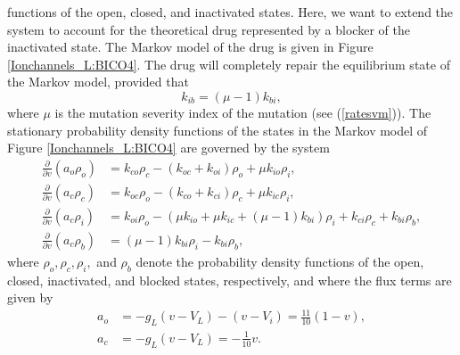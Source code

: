 functions of the open, closed, and inactivated states. Here, we want to extend
the system to account for the theoretical drug represented by a blocker of the
inactivated state. The Markov model of the drug is given in Figure \ref{Ionchannels_L:BICO4}. The drug will
completely repair the equilibrium state of the Markov model, provided that
\begin{equation}
k_{ib}=\left(  \mu-1\right)  k_{bi}\label{kib},
\end{equation}
where $\mu$ is the mutation severity index of the mutation (see (\ref{ratesvm})). The
stationary probability density functions of the states in the Markov model of
Figure \ref{Ionchannels_L:BICO4} are governed by the system
\begin{align}
\frac{\partial}{\partial v}\left(  a_{o}\rho_{o}\right)   &  =k_{co}\rho
_{c}-\left(  k_{oc}+ k_{oi}\right)  \rho_{o}+\mu k_{io}\rho
_{i},\label{bvpdfi1}\\
\frac{\partial}{\partial v}\left(  a_{c}\rho_{c}\right)   &  =k_{oc}\rho
_{o}-\left(  k_{co}+ k_{ci}\right)  \rho_{c}+\mu k_{ic}\rho
_{i},\label{bvpdfi2}\\
\frac{\partial}{\partial v}\left(  a_{c}\rho_{i}\right)   &  = k_{oi}\rho_{o}-(\mu k_{io}+\mu k_{ic}+\left(  \mu-1\right)  k_{bi})\rho_{i}
+k_{ci}\rho_{c}+k_{bi}\rho_{b},\label{bvpdfi3}\\
\frac{\partial}{\partial v}\left(  a_{c}\rho_{b}\right)   &  =\left(
\mu-1\right)  k_{bi}\rho_{i}-k_{bi}\rho_{b},\label{bvpdfi4}
\end{align}
where $\rho_{o},\rho_{c},\rho_{i},$ and $\rho_{b}$ denote the probability density
functions of the open, closed, inactivated, and blocked states, respectively, 
and where the flux terms are given by
\begin{align*}
a_{o} &  =-g_{L}\left(  v-V_{L}\right)  -(v-V_{i})=\frac{11}{10}\left(
1-v\right)  ,\\
a_{c} &  =-g_{L}\left(  v-V_{L}\right)  =-\frac{1}{10}v.
\end{align*}
